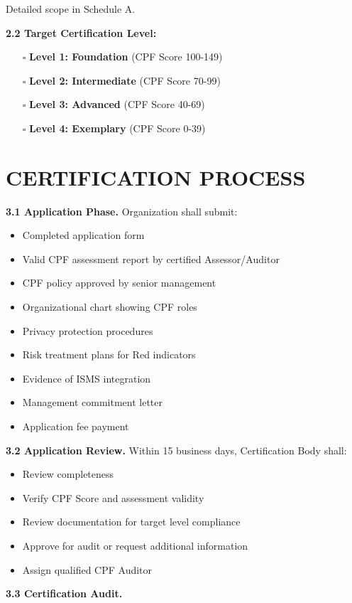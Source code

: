 \documentclass[11pt,a4paper]{article}
\begin{document}
Detailed scope in Schedule A.

\textbf{2.2 Target Certification Level:}

\begin{itemize}
\item[$\square$] \textbf{Level 1: Foundation} (CPF Score 100-149)
\item[$\square$] \textbf{Level 2: Intermediate} (CPF Score 70-99)
\item[$\square$] \textbf{Level 3: Advanced} (CPF Score 40-69)
\item[$\square$] \textbf{Level 4: Exemplary} (CPF Score 0-39)
\end{itemize}

\section{CERTIFICATION PROCESS}

\textbf{3.1 Application Phase.} Organization shall submit:
\begin{itemize}
\item Completed application form
\item Valid CPF assessment report by certified Assessor/Auditor
\item CPF policy approved by senior management
\item Organizational chart showing CPF roles
\item Privacy protection procedures
\item Risk treatment plans for Red indicators
\item Evidence of ISMS integration
\item Management commitment letter
\item Application fee payment
\end{itemize}

\textbf{3.2 Application Review.} Within 15 business days, Certification Body shall:
\begin{itemize}
\item Review completeness
\item Verify CPF Score and assessment validity
\item Review documentation for target level compliance
\item Approve for audit or request additional information
\item Assign qualified CPF Auditor
\end{itemize}

\textbf{3.3 Certification Audit.}
\end{document}
